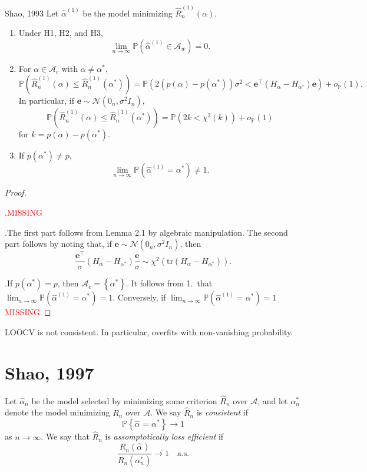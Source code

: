 \documentclass[12pt, letter paper]{article}
\newcommand{\1}{\mathmybb{1}}
\newcommand{\0}{\emptyset}
\newcommand{\prob}{\mathbb{P}}
\newcommand{\paren}[1]{\left(#1 \right)}
\newcommand{\set}[1]{\left\{ #1 \right\}}
\newcommand{\Acal}{\mathcal{A}}
\newcommand{\Ncal}{\mathcal{N}}
\newcommand{\e}{\boldsymbol{e}}
\newcommand{\Rhat}[2]{\hat{R}_{n}^{#1}\paren{#2}}
\newcommand{\alphahat}[1]{\hat{\alpha}^{#1}}
\newcommand{\op}[1]{o_{\prob}\paren{#1}}
\begin{document}
\begin{proposition}{{Shao, 1993}}
    Let \(\alphahat{(1)}\) be the model minimizing \(\Rhat{(1)}{\alpha}\).
    \begin{enumerate}
        \item Under H1, H2, and H3, \[\lim_{n\to\infty}\prob\paren{\alphahat{(1)}\in\Acal_{w}}=0.\]
        \item For \(\alpha\in\Acal_{c}\) with \(\alpha\neq\alpha^{*}\),\[\prob\paren{\Rhat{(1)}{\alpha}\leq \Rhat{(1)}{\alpha^{*}}} = \prob\paren{2\paren{p(\alpha) - p(\alpha^{*})}\sigma^{2} < \e^{\top}(H_{\alpha} - H_{\alpha^{*}})\e} + \op{1}.\] In particular, if \(\e\sim\Ncal(0_{n}, \sigma^{2}I_n)\), \[\prob\paren{\Rhat{(1)}{\alpha}\leq \Rhat{(1)}{\alpha^{*}}} = \prob\paren{2k < \chi^{2}(k)} + \op{1} \] for \(k=p(\alpha) - p(\alpha^{*})\).
        \item If \(p(\alpha^*) \neq p\), \[\lim_{n\to\infty}\prob\paren{\alphahat{(1)}=\alpha^{*}}\neq 1.\]
    \end{enumerate}
\end{proposition}

\begin{proof}
    \(\)

    .\quad \textcolor{red}{MISSING}

    .\quad The first part follows from Lemma 2.1 by algebraic manipulation. The second part follows by noting that, if \(\e\sim\Ncal(0_{n}, \sigma^{2}I_{n})\), then \[\frac{\e^{\top}}{\sigma}\paren{H_{\alpha} - H_{\alpha^{*}}}\frac{\e}{\sigma}\sim\chi^{2}\paren{\mathrm{tr}\paren{H_{\alpha}-H_{\alpha^{*}}}}.\]

    .\quad If \(p(\alpha^{*}) = p\), then \(\Acal_{c} = \set{\alpha^{*}}\). It follows from 1.\ that \(\lim_{n\to\infty}\prob\paren{\alphahat{(1)}=\alpha^{*} }= 1\).
    Conversely, if \(\lim_{n\to\infty}\prob\paren{\alphahat{(1)}=\alpha^{*}} = 1\) \textcolor{red}{MISSING}
\end{proof}

\begin{proposition}[Corollary]{}
    LOOCV is not consistent. In particular, overfits with non-vanishing probability.
\end{proposition}

\section{Shao, 1997~\cite{shao_asymptotic_1997}}
\begin{definition}
    Let \(\alphahat{}_{n}\) be the model selected by minimizing some criterion \(\hat{R}_{n}\) over \(\Acal\), and let \(\alpha^{*}_{n}\) denote the model minimizing \(R_{n}\) over \(\Acal\). We say \(\hat{R}_{n}\) is \emph{consistent} if 
    \[\prob\set{\alphahat{} = \alpha^{*}}\to 1\]
    as \(n\to\infty\). We say that \(\hat{R}_{n}\) is \emph{assomptotically loss efficient} if 
    \[\frac{R_{n}(\alphahat{})}{R_{n}(\alpha^{*}_{n})}\to 1\quad\text{a.s.}\]
\end{definition}
\end{document}
